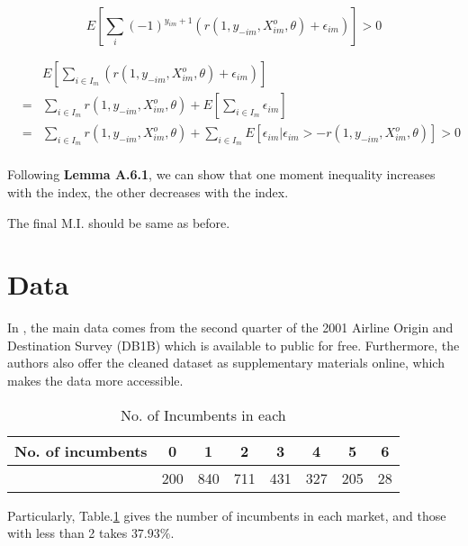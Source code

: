 \documentclass[a4paper]{article}
\begin{document}
$$
E[\sum_i (-1)^{y_{im}+1}(r(1,y_{-im},X^o_{im},\theta) + \epsilon_{im})] > 0
$$

$$
\begin{array}{rcl}

&& \displaystyle E[\sum_{i \in I_m} (r(1,y_{-im},X^o_{im},\theta) + \epsilon_{im})] \\ 
& = & \displaystyle \sum_{i \in I_m} r(1,y_{-im},X^o_{im},\theta) + E[\sum_{i \in I_m} \epsilon_{im}] \\
& = & \displaystyle \sum_{i \in I_m} r(1,y_{-im},X^o_{im},\theta) + \sum_{i \in I_m} E[\epsilon_{im} | \epsilon_{im} > -r(1,y_{-im},X^o_{im},\theta)] > 0 \\
\end{array}
$$

{\color{RedViolet}
Following \textbf{Lemma A.6.1}, we can show that one moment inequality increases with the index, the other decreases with the index.}

The final M.I. should be same as before.       

\section{Data}

In \cite{ciliberto2009market}, the main data comes from the second quarter of the 2001 Airline Origin and Destination Survey (DB1B) which is available to public for free. Furthermore, the authors also offer the cleaned dataset as supplementary materials online, which makes the data more accessible. 

\begin{table}[h!]
\centering
\caption{No. of Incumbents in each }
\begin{tabular}{ cccccccc } 
 \hline
 No. of incumbents & 0 & 1 & 2 & 3 & 4 & 5 & 6 \\ 
 \hline
 & 200 & 840 & 711 & 431 & 327 & 205 & 28 \\ 
 \hline
\end{tabular}
\label{no.of.icb}

\end{table}

Particularly, Table.\ref{no.of.icb} gives the number of incumbents in each market, and those with less than 2 takes $37.93\%$.




\end{document}
